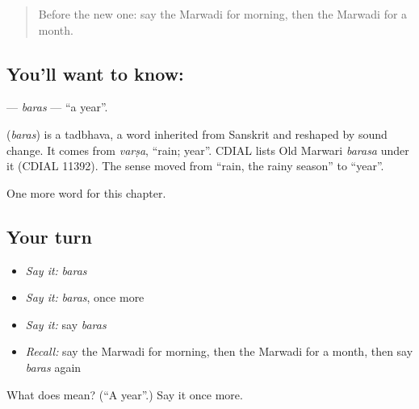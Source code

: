 \label{lesson:MW-C78-baras}



\begin{quote}
Before the new one: say the Marwadi for morning, then the Marwadi for a month.
\end{quote}

\subsection*{You'll want to know: }
\textbf{} — \emph{baras} — \textquotedblleft{}a year\textquotedblright{}.

\begin{cousinweb}
\textbf{} (\emph{baras}) is a tadbhava, a word inherited from Sanskrit and reshaped by sound change. It comes from \emph{varṣa}, \textquotedblleft{}rain; year\textquotedblright{}. CDIAL lists Old Marwari \emph{barasa} under it (CDIAL 11392). The sense moved from \textquotedblleft{}rain, the rainy season\textquotedblright{} to \textquotedblleft{}year\textquotedblright{}.
\end{cousinweb}

\begin{grammarlens}[title={What you've built}]
One more word for this chapter.
\end{grammarlens}

\subsection*{Your turn}
\begin{itemize}
\raggedright
  \item \emph{Say it:} \emph{baras}
  \item \emph{Say it:} \emph{baras}, once more
  \item \emph{Say it:} say \emph{baras}
  \item \emph{Recall:} say the Marwadi for morning, then the Marwadi for a month, then say \emph{baras} again
\end{itemize}

\begin{tcolorbox}[breakable,colback=teal!4,colframe=teal!35!black,title={Before you move on}]
What does  mean? (\textquotedblleft{}A year\textquotedblright{}.) Say it once more.
\end{tcolorbox}
